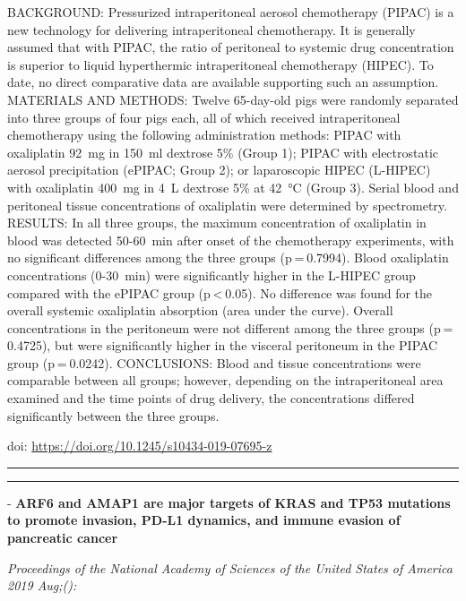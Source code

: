 \documentclass[]{article}
\begin{document}
BACKGROUND: Pressurized intraperitoneal aerosol chemotherapy (PIPAC) is
a new technology for delivering intraperitoneal chemotherapy. It is
generally assumed that with PIPAC, the ratio of peritoneal to systemic
drug concentration is superior to liquid hyperthermic intraperitoneal
chemotherapy (HIPEC). To date, no direct comparative data are available
supporting such an assumption. MATERIALS AND METHODS: Twelve 65-day-old
pigs were randomly separated into three groups of four pigs each, all of
which received intraperitoneal chemotherapy using the following
administration methods: PIPAC with oxaliplatin 92~mg in 150~ml dextrose
5\% (Group 1); PIPAC with electrostatic aerosol precipitation (ePIPAC;
Group 2); or laparoscopic HIPEC (L-HIPEC) with oxaliplatin 400~mg in 4~L
dextrose 5\% at 42~°C (Group 3). Serial blood and peritoneal tissue
concentrations of oxaliplatin were determined by spectrometry. RESULTS:
In all three groups, the maximum concentration of oxaliplatin in blood
was detected 50-60~min after onset of the chemotherapy experiments, with
no significant differences among the three groups (p = 0.7994). Blood
oxaliplatin concentrations (0-30~min) were significantly higher in the
L-HIPEC group compared with the ePIPAC group (p \textless{} 0.05). No
difference was found for the overall systemic oxaliplatin absorption
(area under the curve). Overall concentrations in the peritoneum were
not different among the three groups (p = 0.4725), but were
significantly higher in the visceral peritoneum in the PIPAC group
(p = 0.0242). CONCLUSIONS: Blood and tissue concentrations were
comparable between all groups; however, depending on the intraperitoneal
area examined and the time points of drug delivery, the concentrations
differed significantly between the three groups.

doi: \url{https://doi.org/10.1245/s10434-019-07695-z}

{}

{}

\begin{center}\rule{0.5\linewidth}{\linethickness}\end{center}

\begin{center}\rule{0.5\linewidth}{\linethickness}\end{center}

 - \textbf{ARF6 and AMAP1 are major targets of KRAS and TP53 mutations
to promote invasion, PD-L1 dynamics, and immune evasion of pancreatic
cancer}

\emph{Proceedings of the National Academy of Sciences of the United
States of America 2019 Aug;():}
\end{document}
